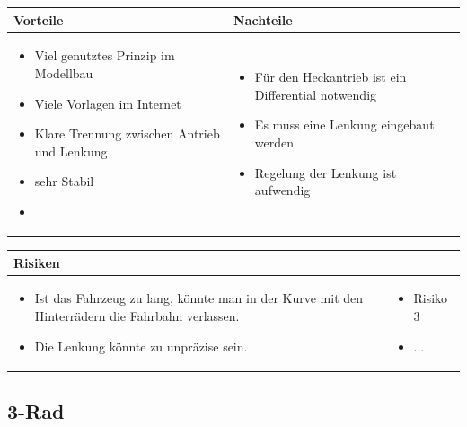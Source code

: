 \begin{table}[h]
\begin{tabular}{p{} | p{}}


 \textbf{Vorteile} & \textbf{Nachteile} \\ \hline
	 
\begin{itemize}
\item Viel genutztes Prinzip im Modellbau
\item Viele Vorlagen im Internet
\item Klare Trennung zwischen Antrieb und Lenkung
\item sehr Stabil
\item 
\end{itemize}

 
 &
 
\begin{itemize}
\item Für den Heckantrieb ist ein Differential notwendig
\item Es muss eine Lenkung eingebaut werden 
\item Regelung der Lenkung ist aufwendig
\end{itemize}

\end{tabular}
\end{table}

\begin{table}[h]
\begin{tabular}{p{}p{}}


 \textbf{Risiken} & \\ \hline
	 
\begin{itemize}
\item Ist das Fahrzeug zu lang, könnte man in der Kurve mit den Hinterrädern die Fahrbahn verlassen.
\item Die Lenkung könnte zu unpräzise sein.
\end{itemize}
&
\begin{itemize}
\item Risiko 3
\item ...
\end{itemize}

 
\end{tabular}
\end{table}

\pagebreak


\subsection{3-Rad}

